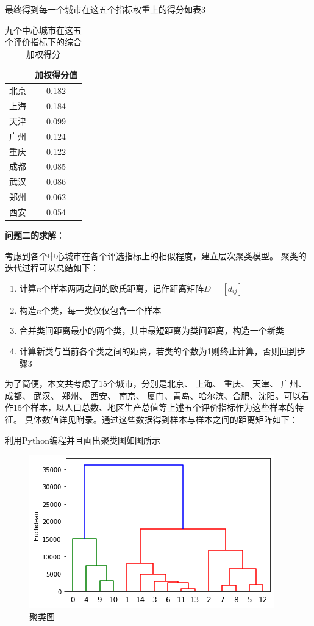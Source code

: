 \documentclass[openany,oneside]{ctexbook}
\begin{document}
最终得到每一个城市在这五个指标权重上的得分如表3
\begin{table}[!htp]
   \centering
   \begin{tabular}{|l|c|}
      \hline
      &加权得分值 \\ \hline
      北京&0.182 \\ \hline
      上海&0.184 \\ \hline
      天津&0.099 \\ \hline
      广州&0.124 \\ \hline
      重庆&0.122 \\ \hline
      成都&0.085 \\ \hline
      武汉&0.086 \\ \hline
      郑州&0.062 \\ \hline
      西安&0.054 \\ \hline
      
   \end{tabular}
   \caption{九个中心城市在这五个评价指标下的综合加权得分}
\end{table}

{\bfseries 问题二的求解}：

考虑到各个中心城市在各个评选指标上的相似程度，建立层次聚类模型。
聚类的迭代过程可以总结如下：
\begin{enumerate}
   \item 计算$n$个样本两两之间的欧氏距离，记作距离矩阵$D=[d_{ij}]$
   \item 构造$n$个类，每一类仅仅包含一个样本
   \item 合并类间距离最小的两个类，其中最短距离为类间距离，构造一个新类
   \item 计算新类与当前各个类之间的距离，若类的个数为1则终止计算，否则回到步骤3
   
\end{enumerate}

为了简便，本文共考虑了15个城市，分别是北京、
上海、
重庆、
天津、
广州、
成都、
武汉、
郑州、
西安、
南京、
厦门、青岛、哈尔滨、合肥、沈阳。可以看作15个样本，以人口总数、地区生产总值等上述五个评价指标作为这些样本的特征。
具体数值详见附录。通过这些数据得到样本与样本之间的距离矩阵如下：

利用Python编程并且画出聚类图如图所示

\begin{figure}[htp]
   \centering
   \includegraphics[scale=0.8]{cluster.png}
   \caption{聚类图}
\end{figure}
\end{document}
